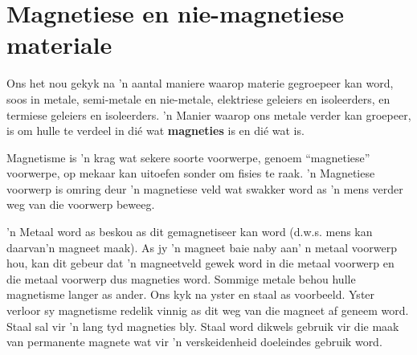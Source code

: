             \section{Magnetiese en nie-magnetiese materiale}
            \nopagebreak
      \label{m38706*id67151}Ons het nou gekyk na 'n aantal maniere waarop materie gegroepeer kan word, soos in metale, semi-metale en nie-metale, elektriese geleiers en isoleerders, en termiese geleiers en isoleerders. 'n Manier waarop ons metale verder kan groepeer, is om hulle te verdeel in di\'e wat \textbf{magneties} is en di\'e wat  is.\par 
\par
\Definition{   \label{id2410309} { Magnetisme }} { \label{m38706*meaningfhsst!!!underscore!!!id570}
      \label{m38706*id67174}       Magnetisme is 'n krag wat sekere soorte voorwerpe, genoem ``magnetiese'' voorwerpe, op mekaar kan uitoefen sonder om fisies te raak. 'n Magnetiese voorwerp is omring deur 'n magnetiese veld wat swakker word as 'n mens verder weg van die voorwerp beweeg.\par 
       } 
\begin{minipage}{.5\textwidth}
      \label{m38706*id67186}'n Metaal word as  beskou as dit gemagnetiseer kan word (d.w.s. mens kan daarvan'n magneet maak). As jy 'n magneet baie naby aan' n metaal voorwerp hou, kan dit gebeur dat 'n magneetveld gewek word in die metaal voorwerp en die metaal voorwerp dus magneties word. Sommige metale behou hulle magnetisme langer as ander. Ons kyk na yster en staal as voorbeeld. Yster verloor sy magnetisme redelik vinnig as dit weg van die magneet af geneem word. Staal sal vir 'n lang tyd magneties bly. Staal word dikwels gebruik vir die maak van permanente magnete wat vir 'n verskeidenheid doeleindes gebruik word.\par 
\end{minipage}
